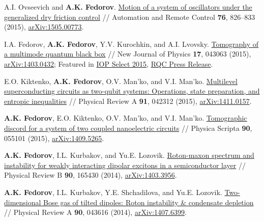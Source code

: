 \documentclass[10pt,a4paper,sans]{moderncv}
\begin{document}
	{A.I. Ovseevich  and \textbf{A.K. Fedorov}. 
	{\textcolor{blue}{\href{http://dx.doi.org/10.1134/S0005117915050082}{Motion of a system of oscillators under the generalized dry friction control}}} // 
	Automation and Remote Control \textbf{76}, 826--833 (2015),
	{\textcolor{blue}{\href{http://arxiv.org/abs/1505.00773}{arXiv:1505.00773}}}.}

	{I.A. Fedorov, \textbf{A.K. Fedorov}, Y.V. Kurochkin, and A.I. Lvovsky. 
	{\textcolor{blue}{\href{http://dx.doi.org/10.1088/1367-2630/17/4/043063}{Tomography of a multimode quantum black box}}} //
	New Journal of Physics \textbf{17}, 043063 (2015), {\textcolor{blue}{\href{http://arxiv.org/abs/1403.0432}{arXiv:1403.0432}}};
	Featured in {\textcolor{blue}{\href{http://iopscience.iop.org/article/10.1088/1367-2630/17/4/043063/meta}{IOP Select 2015}}},
	{\textcolor{blue}{\href{http://www.rqc.ru/news/?ELEMENT_ID=1195}{RQC Press Release}}}.}

	{E.O. Kiktenko, \textbf{A.K. Fedorov}, O.V. Man'ko, and V.I. Man'ko. 
	{\textcolor{blue}{\href{http://dx.doi.org/10.1103/PhysRevA.91.042312}{Multilevel superconducting circuits as two-qubit systems: Operations, state preparation, and entropic inequalities}}} //
	Physical Review A \textbf{91}, 042312 (2015),
	{\textcolor{blue}{\href{http://arxiv.org/abs/1411.0157}{arXiv:1411.0157}}}.} 

	{\textbf{A.K. Fedorov}, E.O. Kiktenko, O.V. Man'ko, and V.I. Man'ko. 
	{\textcolor{blue}{\href{http://dx.doi.org/10.1088/0031-8949/90/5/055101}{Tomographic discord for a system of two coupled nanoelectric circuits}}} //
	Physica Scripta \textbf{90}, 055101 (2015),
	{\textcolor{blue}{\href{http://arxiv.org/abs/1409.5265}{arXiv:1409.5265}}}.}

	{\textbf{A.K. Fedorov}, I.L. Kurbakov, and Yu.E. Lozovik. 
	{\textcolor{blue}{\href{http://dx.doi.org/10.1103/PhysRevB.90.165430}{Roton-maxon spectrum and instability for weakly interacting dipolar excitons in a semiconductor layer}}} //
	Physical Review B \textbf{90}, 165430 (2014),
	{\textcolor{blue}{\href{http://arxiv.org/abs/1403.3956}{arXiv:1403.3956}}}.}
	
	{\textbf{A.K. Fedorov}, I.L. Kurbakov, Y.E. Shchadilova, and Yu.E. Lozovik.
	{\textcolor{blue}{\href{http://dx.doi.org/10.1103/PhysRevA.90.043616}{Two-dimensional Bose gas of tilted dipoles: Roton instability \& condensate depletion}}} //
	Physical Review A \textbf{90}, 043616 (2014),
	{\textcolor{blue}{\href{http://arxiv.org/abs/1407.6399}{arXiv:1407.6399}}}.}
\end{document}
